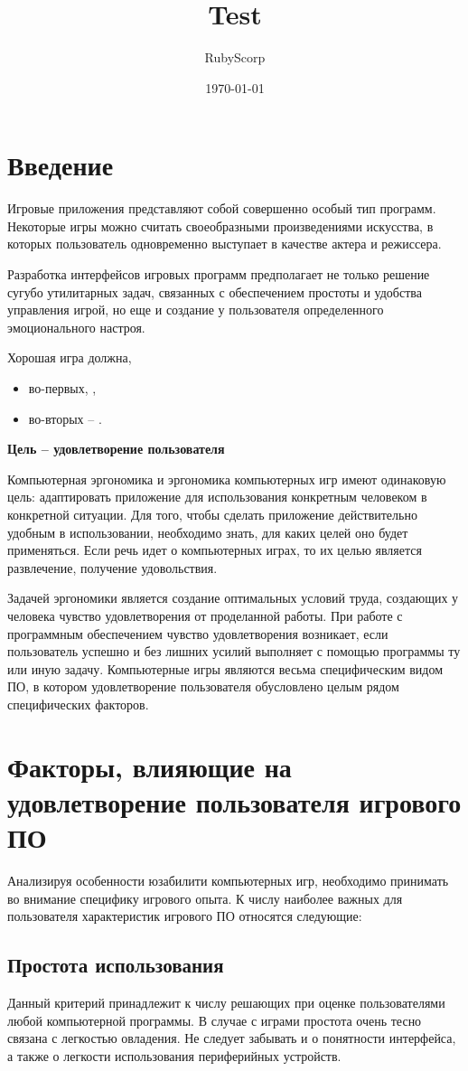 \documentclass{article}
\title{Test}
\author{RubyScorp}
\date{\today}
\begin{document}
\section{Введение}
Игровые приложения представляют собой совершенно особый тип программ. Некоторые игры можно считать своеобразными произведениями искусства, в которых пользователь одновременно выступает в качестве актера и режиссера.

Разработка интерфейсов игровых программ предполагает не только решение сугубо утилитарных задач, связанных с обеспечением простоты и удобства управления игрой, но еще и создание у пользователя определенного эмоционального настроя.

\bigskip\noindent Хорошая игра должна,
\begin{itemize}
  \item во-первых, ,
  \item во-вторых -- .
\end{itemize}

\textbf{Цель -- удовлетворение пользователя}

Компьютерная эргономика и эргономика компьютерных игр имеют одинаковую цель: адаптировать приложение для использования конкретным человеком в конкретной ситуации. Для того, чтобы сделать приложение действительно удобным в использовании, необходимо знать, для каких целей оно будет применяться. Если речь идет о компьютерных играх, то их целью является развлечение, получение удовольствия.

Задачей эргономики является создание оптимальных условий труда, создающих у человека чувство удовлетворения от проделанной работы. При работе с программным обеспечением чувство удовлетворения возникает, если пользователь успешно и без лишних усилий выполняет с помощью программы ту или иную задачу. Компьютерные игры являются весьма специфическим видом ПО, в котором удовлетворение пользователя обусловлено целым рядом специфических факторов.

\section{Факторы, влияющие на удовлетворение пользователя игрового ПО}
Анализируя особенности юзабилити компьютерных игр, необходимо принимать во внимание специфику игрового опыта. К числу наиболее важных для пользователя характеристик игрового ПО относятся следующие:

\subsection{Простота использования}
Данный критерий принадлежит к числу решающих при оценке пользователями любой компьютерной программы. В случае с играми простота очень тесно связана с легкостью овладения. Не следует забывать и о понятности интерфейса, а также о легкости использования периферийных устройств.
\end{document}
